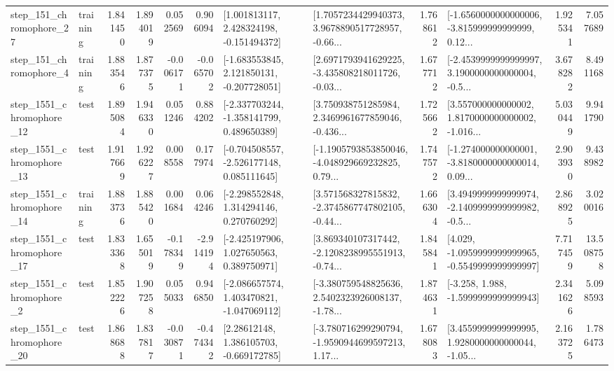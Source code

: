 \begin{tabular}{llrrrrllrlrr}
  step\_151\_chromophore\_27 &  training &      1.841450 &    1.894019 &      0.052569 &  0.906094 &    [1.001813117, 2.428324198, -0.151494372] &  [1.7057234429940373, 3.9678890517728957, -0.66... &       1.768612 &  [-1.6560000000000006, -3.815999999999999, 0.12... &            1.925341 &          7.057689 \\
   step\_151\_chromophore\_4 &  training &      1.883546 &    1.877375 &     -0.006171 & -0.065702 &   [-1.683553845, 2.121850131, -0.207728051] &  [2.6971793941629225, -3.435808218011726, -0.03... &       1.677712 &  [-2.4539999999999997, 3.1900000000000004, -0.5... &            3.678282 &          8.491168 \\
 step\_1551\_chromophore\_12 &      test &      1.895084 &    1.946330 &      0.051246 &  0.884202 &   [-2.337703244, -1.358141799, 0.489650389] &  [3.750938751285984, 2.3469961677859046, -0.436... &       1.725662 &  [3.557000000000002, 1.8170000000000002, -1.016... &            5.030449 &          9.941790 \\
 step\_1551\_chromophore\_13 &      test &      1.917669 &    1.926227 &      0.008558 &  0.177974 &   [-0.704508557, -2.526177148, 0.085111645] &  [-1.1905793853850046, -4.048929669232825, 0.79... &       1.747572 &  [-1.274000000000001, -3.8180000000000014, 0.09... &            2.903930 &          9.438982 \\
 step\_1551\_chromophore\_14 &  training &      1.883736 &    1.885420 &      0.001684 &  0.064246 &    [-2.298552848, 1.314294146, 0.270760292] &  [3.571568327815832, -2.3745867747802105, -0.44... &       1.666304 &  [3.4949999999999974, -2.1409999999999982, -0.5... &            2.868925 &          3.020016 \\
 step\_1551\_chromophore\_17 &      test &      1.833368 &    1.655019 &     -0.178349 & -2.914194 &    [-2.425197906, 1.027650563, 0.389750971] &  [3.869340107317442, -2.1208238995551913, -0.74... &       1.845841 &  [4.029, -1.0959999999999965, -0.5549999999999997] &            7.717459 &         13.508758 \\
  step\_1551\_chromophore\_2 &      test &      1.852226 &    1.907258 &      0.055033 &  0.946850 &   [-2.086657574, 1.403470821, -1.047069112] &  [-3.380759548825636, 2.5402323926008137, -1.78... &       1.874631 &               [-3.258, 1.988, -1.5999999999999943] &            2.341626 &          5.098593 \\
 step\_1551\_chromophore\_20 &      test &      1.868688 &    1.837817 &     -0.030871 & -0.474342 &     [2.28612148, 1.386105703, -0.669172785] &  [-3.780716299290794, -1.9590944699597213, 1.17... &       1.678083 &  [3.4559999999999995, 1.9280000000000044, -1.05... &            2.163725 &          1.786473 \\

\end{tabular}
